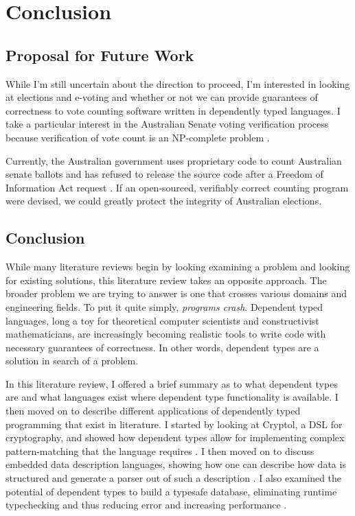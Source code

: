 
\chapter{Conclusion}

\section{Proposal for Future Work}

While I'm still uncertain about the direction to proceed, I'm interested in
looking at elections and e-voting and whether or not we can provide guarantees
of correctness to vote counting software written in dependently typed languages.
I take a particular interest in the Australian Senate voting verification
process because verification of vote count is an NP-complete problem
\cite{aus_senate}. 

Currently, the Australian government uses proprietary code to count Australian
senate ballots and has refused to release the source code after a Freedom of
Information Act request \cite{aus_senate_news}. If an open-sourced, verifiably
correct counting program were devised, we could greatly protect the integrity of
Australian elections. 

\section{Conclusion}
While many literature reviews begin by looking examining a problem and looking
for existing solutions, this literature review takes an opposite approach. The
broader problem we are trying to answer is one that crosses various domains and
engineering fields. To put it quite simply, \textit{programs crash}. Dependent
typed languages, long a toy for theoretical computer scientists and
constructivist mathematicians, are increasingly becoming realistic tools to
write code with necessary guarantees of correctness. In other words, dependent
types are a solution in search of a problem. 

In this literature review, I offered a brief summary as to what dependent types
are and what languages exist where dependent type functionality is available. I
then moved on to describe different applications of dependently typed
programming that exist in literature. I started by looking at Cryptol, a DSL for
cryptography, and showed how dependent types allow for implementing complex
pattern-matching that the language requires \cite{power_of_pi}. I then moved on
to discuss embedded data description languages, showing how one can describe how
data is structured and generate a parser out of such a description
\cite{power_of_pi}. I also examined the potential of dependent types to build a
typesafe database, eliminating runtime typechecking and thus reducing error and
increasing performance \cite{power_of_pi,eisenberg2016}. 

